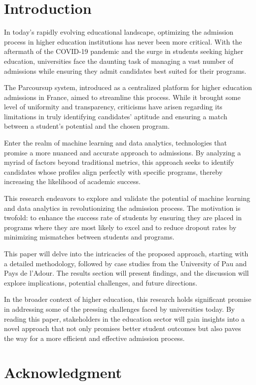 \documentclass[conference]{IEEEtran}
\begin{document}
\section{Introduction}
In today's rapidly evolving educational landscape, optimizing the admission process in higher education institutions has never been more critical. With the aftermath of the COVID-19 pandemic and the surge in students seeking higher education, universities face the daunting task of managing a vast number of admissions while ensuring they admit candidates best suited for their programs.

The Parcoursup system, introduced as a centralized platform for higher education admissions in France, aimed to streamline this process. While it brought some level of uniformity and transparency, criticisms have arisen regarding its limitations in truly identifying candidates' aptitude and ensuring a match between a student's potential and the chosen program.

Enter the realm of machine learning and data analytics, technologies that promise a more nuanced and accurate approach to admissions. By analyzing a myriad of factors beyond traditional metrics, this approach seeks to identify candidates whose profiles align perfectly with specific programs, thereby increasing the likelihood of academic success.

This research endeavors to explore and validate the potential of machine learning and data analytics in revolutionizing the admission process. The motivation is twofold: to enhance the success rate of students by ensuring they are placed in programs where they are most likely to excel and to reduce dropout rates by minimizing mismatches between students and programs.

This paper will delve into the intricacies of the proposed approach, starting with a detailed methodology, followed by case studies from the University of Pau and Pays de l’Adour. The results section will present findings, and the discussion will explore implications, potential challenges, and future directions.

In the broader context of higher education, this research holds significant promise in addressing some of the pressing challenges faced by universities today. By reading this paper, stakeholders in the education sector will gain insights into a novel approach that not only promises better student outcomes but also paves the way for a more efficient and effective admission process.


\section*{Acknowledgment}
\vspace{12pt}


\end{document}
